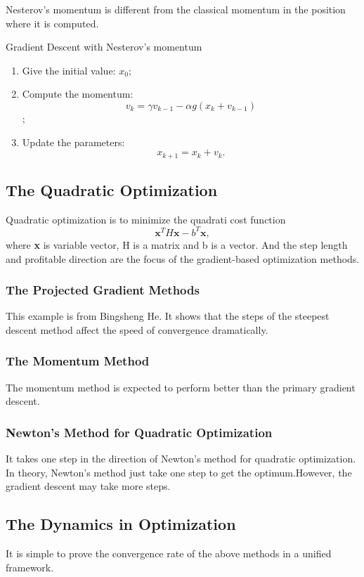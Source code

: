 \documentclass[11pt]{article} %
\begin{document}
Nesterov's momentum is different from the classical momentum in the position where it is computed.
\begin{algorithm}[htb]
\caption{Gradient Descent with Nesterov's momentum}
\label{ Nesterov's momentum}
\begin{enumerate}
 \item Give the initial value: $x_0$;
 \item Compute the momentum:$$v_k= \gamma  v_{k-1}-\alpha g({x}_k+v_{k-1})$$;
 \item Update the parameters:$${x}_{k+1}={x}_k + v_k.$$
\end{enumerate}
\subsection{The Quadratic Optimization}
Quadratic optimization is to minimize the quadrati cost function
$${\textbf{x}^{T}H\textbf{x}-b^{T}\textbf{x}},$$ where \textbf{x} is variable vector, H is a matrix and b is a vector.
And the step length and profitable direction are the focus of the gradient-based optimization methods.

\subsubsection{The Projected Gradient Methods}
This example is from Bingsheng He. %
It shows that the steps  of the steepest descent method affect the speed of convergence dramatically.
\subsubsection{The Momentum Method}
The momentum method is expected to perform better than the primary gradient descent.
\subsubsection{Newton's Method for Quadratic Optimization}
It takes one step in the direction of Newton's method for quadratic optimization.
In theory, Newton's method just take one step to get the optimum.However, the gradient descent may take more steps.

\subsection{The Dynamics in Optimization}
It is simple to prove the convergence rate of the above methods in a unified framework.


\end{algorithm}
\end{document}
